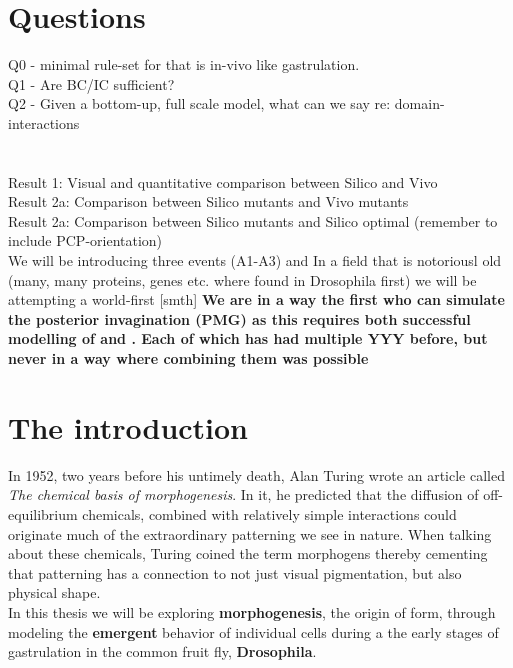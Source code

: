 
\section{Questions}
Q0 - minimal rule-set for that is in-vivo like gastrulation. \\
Q1 - Are BC/IC sufficient?\\
Q2 - Given a bottom-up, full scale model, what can we say re: domain-interactions\\
\\\\
Result 1: Visual and quantitative comparison between Silico and Vivo\\
Result 2a: Comparison between Silico mutants and Vivo mutants\\
Result 2a: Comparison between Silico mutants and Silico optimal (remember to include PCP-orientation)\\


We will be introducing three events (A1-A3) and 
In a field that is notoriousl old (many, many proteins, genes etc. where found in Drosophila first) we will be attempting a world-first [smth]
\textbf{We are in a way the first who can simulate the posterior invagination (PMG)  as this requires both successful modelling of  and . Each of which has had multiple YYY before, but never in a way where combining them was possible}





\section{The introduction}
In 1952, two years before his untimely death, Alan Turing wrote an article called \textit{The chemical basis of morphogenesis}.\cite{turing52the} In it, he predicted that the diffusion of off-equilibrium chemicals, combined with relatively simple interactions could originate much of the extraordinary patterning we see in nature. When talking about these chemicals, Turing coined the term morphogens thereby cementing that patterning has a connection to not just visual pigmentation, but also physical shape. \\

In this thesis we will be exploring \textbf{morphogenesis}, the origin of form, through modeling the \textbf{emergent} behavior of individual cells during a the early stages of gastrulation in the common fruit fly, \textbf{Drosophila}.\\

